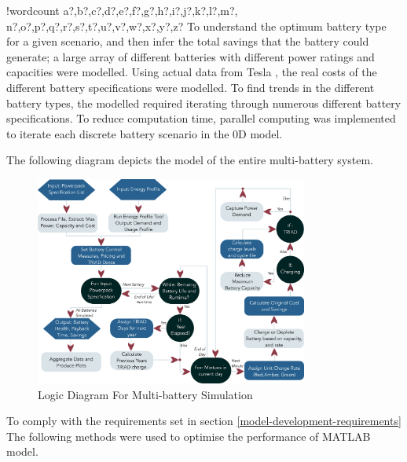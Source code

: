\documentclass[fontsize=9.5pt]{extarticle}
\numberwithin{figure}{section} %
\newcounter{words}
\newenvironment{counted}{%
  \setcounter{words}{0}
  \SearchList!{wordcount}{\stepcounter{words}}
    {a?,b?,c?,d?,e?,f?,g?,h?,i?,j?,k?,l?,m?,
    n?,o?,p?,q?,r?,s?,t?,u?,v?,w?,x?,y?,z?}
  \UndoBoundary{'}
  \SearchOrder{p;}}{%
  \StopSearching}
\begin{document}
\begin{counted}
To understand the optimum battery type for a given scenario, and then
infer the total savings that the battery could generate; a large array
of different batteries with different power ratings and capacities were
modelled. Using actual data from Tesla \cite{Powerpac23:online}, the
real costs of the different battery specifications were modelled. To
find trends in the different battery types, the modelled required
iterating through numerous different battery specifications. To reduce
computation time, parallel computing was implemented to iterate each
discrete battery scenario in the 0D model.

The following diagram depicts the model of the entire multi-battery
system.

\begin{figure}[H]
 \centering
 \includegraphics[trim = 0 0 0 0, clip, width=0.8\textwidth]{largelogic.eps}
 \caption{Logic Diagram For Multi-battery Simulation}
 \label{largelogic}
 \end{figure}

To comply with the requirements set in section
\ref{model-development-requirements} The following methods were used to
optimise the performance of MATLAB model.


\end{counted}
\end{document}
